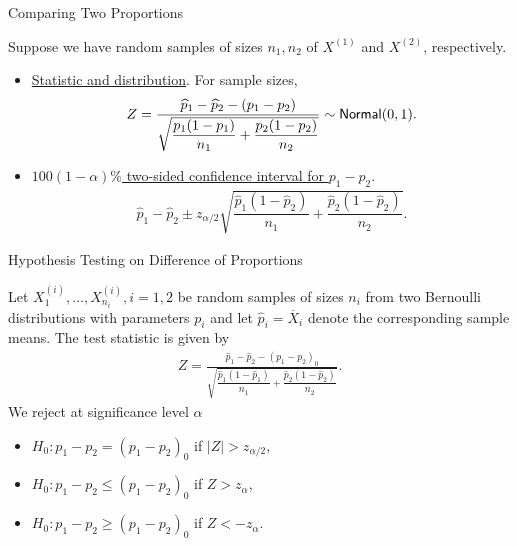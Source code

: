 \begin{frame}{Comparing Two Proportions}

\justifying
{} Suppose we have random samples of sizes $n_1, n_2$ of $X^{(1)}$ and $X^{(2)}$, respectively.
\begin{itemize}
	\item \underline{Statistic and distribution}. For  sample sizes,
	\begin{align*}
	Z = \frac{\widehat{p}_1 - \widehat{p}_2 - (p_1-p_2)}{\sqrt{\dfrac{p_1(1-p_1)}{n_1} + \dfrac{p_2(1-p_2)}{n_2}}} \sim \mathsf{Normal}(0, 1).
	\end{align*}
	\item \underline{$100(1-\alpha)\%$ two-sided confidence interval for $p_1-p_2$}.
	\begin{align*}
	\widehat{p}_1-\widehat{p}_2 \pm z_{\alpha/2}\sqrt{\dfrac{\widehat{p}_1(1-\widehat{p}_2)}{n_1} + \dfrac{\widehat{p}_2(1-\widehat{p}_2)}{n_2}}.
	\end{align*}
\end{itemize}

\end{frame}

\begin{frame}{Hypothesis Testing on Difference of Proportions}

\justifying
{} Let $X_1^{(i)}, \ldots, X_{n_i}^{(i)}, i = 1, 2$ be random samples of sizes $n_i$ from two Bernoulli distributions with parameters $p_i$ and let $\widehat{p}_i = \overline{X}_i$ denote the corresponding sample means. The test statistic is given by
\begin{align*}
Z = \frac{\widehat{p}_1 - \widehat{p}_2 - (p_1-p_2)_0}{\sqrt{\dfrac{\widehat{p}_1(1-\widehat{p}_1)}{n_1} + \dfrac{\widehat{p}_2(1-\widehat{p}_2)}{n_2}}}.
\end{align*}
We reject at significance level $\alpha$
\begin{itemize}
	\item $H_0: p_1-p_2 = (p_1-p_2)_0$ if $|Z| > z_{\alpha/2}$,
	\item $H_0: p_1-p_2 \leq (p_1-p_2)_0$ if $Z > z_{\alpha}$,
	\item $H_0: p_1-p_2 \geq (p_1-p_2)_0$ if $Z < -z_{\alpha}$.
\end{itemize}

\end{frame}


